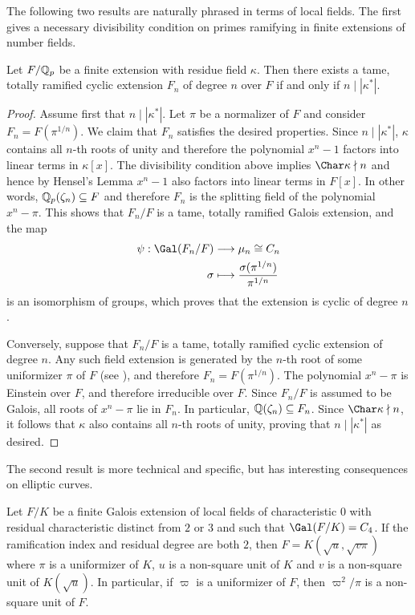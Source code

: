 The following two results are naturally phrased in terms of local fields. The first gives a necessary divisibility condition on primes ramifying in finite extensions of number fields.

\begin{prop}\label{prop_totally_ramified}
    Let $F/\mathbb{Q}_p$ be a finite extension with residue field $\kappa$. Then there exists a tame, totally ramified cyclic extension $F_n$ of degree $n$ over $F$ if and only if $n\mid|\kappa^*|$.
\end{prop}

\begin{proof}
    Assume first that $n\mid|\kappa^*|$. Let $\pi$ be a normalizer of $F$ and consider $F_n=F(\pi^{1/n})$. We claim that $F_n$ satisfies the desired properties. Since $n\mid|\kappa^*|$, $\kappa$ contains all $n$-th roots of unity and therefore the polynomial $x^n-1$ factors into linear terms in $\kappa[x]$. The divisibility condition above implies $\Char\kappa\nmid n$ and hence by Hensel's Lemma $x^n-1$ also factors into linear terms in $F[x]$. In other words, $\mathbb{Q}_p(\zeta_n)\subseteq F$ and therefore $F_n$ is the splitting field of the polynomial $x^n-\pi$. This shows that $F_n/F$ is a tame, totally ramified Galois extension, and the map 
    \begin{align*}
        \psi: \Gal(F_n/F)&\longrightarrow \mu_n\cong C_n\\
        \sigma &\longmapsto \frac{\sigma(\pi^{1/n})}{\pi^{1/n}}
    \end{align*}
    is an isomorphism of groups, which proves that the extension is cyclic of degree $n$.

    Conversely, suppose that $F_n/F$ is a tame, totally ramified cyclic extension of degree $n$. Any such field extension is generated by the $n$-th root of some uniformizer $\pi$ of $F$ (see \cite[Theorem 11.10]{Sun1}), and therefore $F_n=F(\pi^{1/n})$. The polynomial $x^n-\pi$ is Einstein over $F$, and therefore irreducible over $F$. Since $F_n/F$ is assumed to be Galois, all roots of $x^n-\pi$ lie in $F_n$. In particular, $\mathbb{Q}(\zeta_n)\subseteq F_n$. Since $\Char\kappa\nmid n$, it follows that $\kappa$ also contains all $n$-th roots of unity, proving that $n\mid|\kappa^*|$ as desired. 
\end{proof}

The second result is more technical and specific, but has interesting consequences on elliptic curves. 

\begin{lemma}\label{lem_localC4}
    Let $F/K$ be a finite Galois extension of local fields of characteristic $0$ with residual characteristic distinct from $2$ or $3$ and such that $\Gal(F/K)=C_4$. If the ramification index and residual degree are both $2$, then $F=K(\sqrt{u},\sqrt{v\pi})$ where $\pi$ is a uniformizer of $K$, $u$ is a non-square unit of $K$ and $v$ is a non-square unit of $K(\sqrt{u})$.
    In particular, if $\varpi$ is a uniformizer of $F$, then $\varpi^2/\pi$ is a non-square unit of $F$.
\end{lemma}

